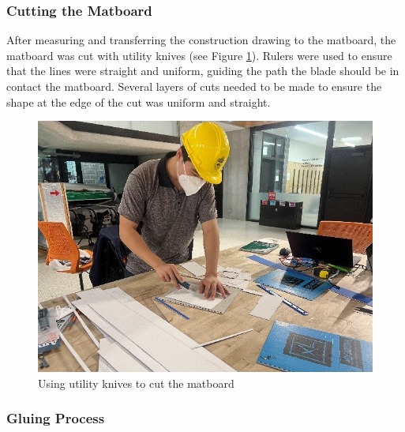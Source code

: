 \documentclass[11pt]{article}
\newcommand{\imagewidth}{.5\linewidth}
\begin{document}
\subsubsection{Cutting the Matboard}

After measuring and transferring the construction drawing to the matboard, the matboard was cut with utility knives (see Figure \ref{c6}). Rulers were used to ensure that the lines were straight and uniform, guiding the path the blade should be in contact the matboard. Several layers of cuts needed to be made to ensure the shape at the edge of the cut was uniform and straight.

\begin{figure}[h]
    \centering
    \includegraphics[width=\imagewidth]{img/construction_6.jpg}
    \caption{Using utility knives to cut the matboard}
    \label{c6}
\end{figure}

\subsubsection{Gluing Process}
\end{document}
